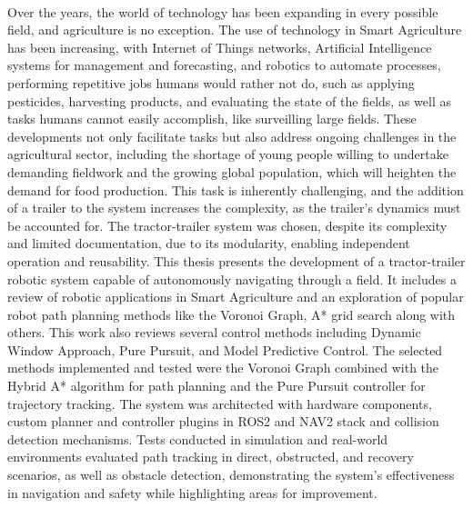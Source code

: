 
%

\paragraph{}

Over the years, the world of technology has been expanding in every possible 
field, and agriculture is no exception. The use of technology in Smart 
Agriculture has been increasing, with Internet of Things networks, 
Artificial Intelligence systems for management and forecasting, 
and robotics to automate processes, performing repetitive jobs humans 
would rather not do, such as applying pesticides, harvesting products, and 
evaluating the state of the fields, as well as tasks humans cannot easily 
accomplish, like surveilling large fields. These developments not only 
facilitate tasks but also address ongoing challenges in the agricultural 
sector, including the shortage of young people willing to undertake 
demanding fieldwork and the growing global population, which will heighten 
the demand for food production. This task is inherently challenging, 
and the addition of a trailer to the system increases the complexity, 
as the trailer’s dynamics must be accounted for. The tractor-trailer 
system was chosen, despite its complexity and limited documentation, 
due to its modularity, enabling independent operation and reusability. 
This thesis presents the development of a tractor-trailer robotic system 
capable of autonomously navigating through a field. It includes a review 
of robotic applications in Smart Agriculture and an exploration of popular 
robot path planning methods like the Voronoi Graph, A* grid search along 
with others. This work also reviews several control methods including 
Dynamic Window Approach, Pure Pursuit, and Model Predictive Control. 
The selected methods implemented and tested were the Voronoi Graph 
combined with the Hybrid A* algorithm for path planning and the Pure 
Pursuit controller for trajectory tracking. The system was architected 
with hardware components, custom planner and controller plugins in ROS2 
and NAV2 stack and collision detection mechanisms. Tests conducted in 
simulation and real-world environments evaluated path tracking in direct, 
obstructed, and recovery scenarios, as well as obstacle detection, 
demonstrating the system’s effectiveness in navigation and safety while 
highlighting areas for improvement.

